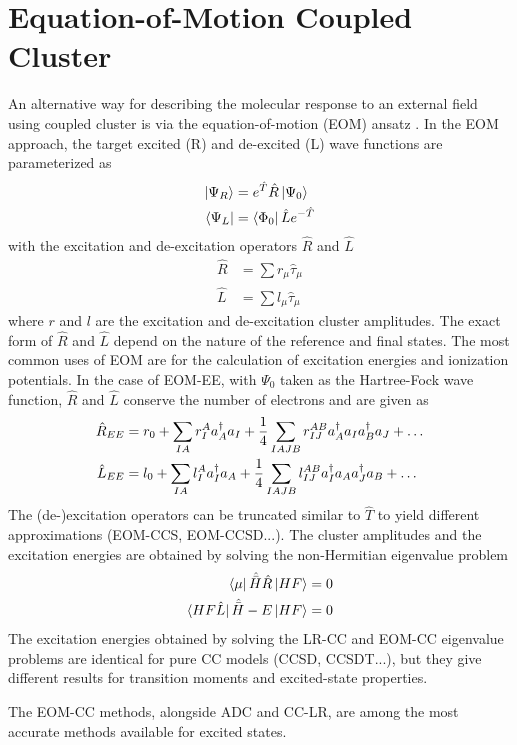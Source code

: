 
\section{Equation-of-Motion Coupled Cluster}

An alternative way for describing the molecular response to an external field using coupled cluster is via the equation-of-motion (EOM) ansatz \cite{Gee1989,EMr1981,Sta1993,Sta1994,Kry2008}. In the EOM approach, the target excited (R) and de-excited (L) wave functions are parameterized as 
\begin{align}
\ket{\smash{\Psi_R}} &= e^{\hat{T}} \hat{R} \ket{\smash{\Psi_0}} \\
\bra{\smash{\Psi_L}} &= \bra{\smash{\Phi_0}} \hat{L} e^{-\hat{T}} 
\end{align}
\noindent with the excitation and de-excitation operators $\hat{R}$ and $\hat{L}$ 
\begin{align}
\hat{R} &= \sum r_{\mu} \hat{\tau}_{\mu} \\
\hat{L} &= \sum l_{\mu} \hat{\tau}_{\mu}
\end{align}
\noindent where $r$ and $l$ are the excitation and de-excitation cluster amplitudes. The exact form of $\hat{R}$ and $\hat{L}$ depend on the nature of the reference and final states. The most common uses of EOM are for the calculation of excitation energies and ionization potentials. In the case of EOM-EE, with $\Psi_0$ taken as the Hartree-Fock wave function, $\hat{R}$ and $\hat{L}$ conserve the number of electrons and are given as
\begin{align}
\hat{R}_{EE} &= r_0 + \sum_{IA} r_I^A a_A^{\dagger} a_I + \frac{1}{4} \sum_{IAJB} r_{IJ}^{AB} a_A^{\dagger} a_I a_B^{\dagger} a_J + \ldots \\
\hat{L}_{EE} &= l_0 + \sum_{IA} l_I^A a_I^{\dagger} a_A + \frac{1}{4} \sum_{IAJB} l_{IJ}^{AB} a_I^{\dagger} a_A a_J^{\dagger} a_B + \ldots
\end{align}
The (de-)excitation operators can be truncated similar to $\hat{T}$ to yield different approximations (EOM-CCS, EOM-CCSD...). The cluster amplitudes and the excitation energies are obtained 
by solving the non-Hermitian eigenvalue problem 
\begin{align}
\bra{\smash{\mu}} \hat{\bar{H}} \hat{R} \ket{\smash{HF}} &= 0 \\
\bra{\smash{HF \hat{L}}} \hat{\bar{H}} - E \ket{\smash{HF}} &= 0
\end{align}
The excitation energies obtained by solving the LR-CC and EOM-CC eigenvalue problems are identical for pure CC models (CCSD, CCSDT...), but they give different results for transition moments and excited-state properties.

The EOM-CC methods, alongside ADC and CC-LR, are among the most accurate methods available for excited states. 




